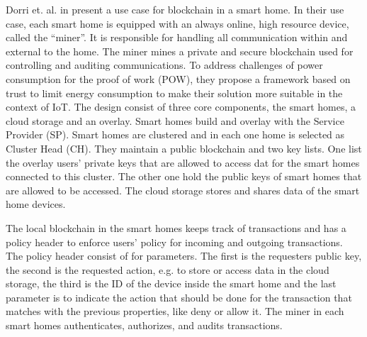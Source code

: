 Dorri et. al. in \cite{Dorri2017SmartHome} present a use case for blockchain in a smart home. In their use case, each smart home is equipped with an always online, high resource device, called the ``miner''. It is responsible for handling all communication within and external to the home.
The miner mines a private and secure blockchain used for controlling and auditing communications. To address challenges of power consumption for the proof of work (POW), they propose a framework based on trust to limit energy consumption to make their solution more suitable in the context of IoT.
The design consist of three core components, the smart homes, a cloud storage and an overlay.
Smart homes build and overlay with the Service Provider (SP). Smart homes are clustered and in each one home is selected as Cluster Head (CH).
They maintain a public blockchain and two key lists. One list the overlay users' private keys that are allowed to access dat for the smart homes connected to this cluster.
The other one hold the public keys of smart homes that are allowed to be accessed.
The cloud storage stores and shares data of the smart home devices.

The local blockchain in the smart homes keeps track of transactions and has a policy header to enforce users' policy for incoming and outgoing transactions.
The policy header consist of for parameters. The first is the requesters public key, the second is the requested action, e.g. to store or access data in the cloud storage, the third is the ID of the device inside the smart home 
and the last parameter is to indicate the action that should be done for the transaction that matches with the previous properties, like deny or allow it.
The miner in each smart homes authenticates, authorizes, and audits transactions.



